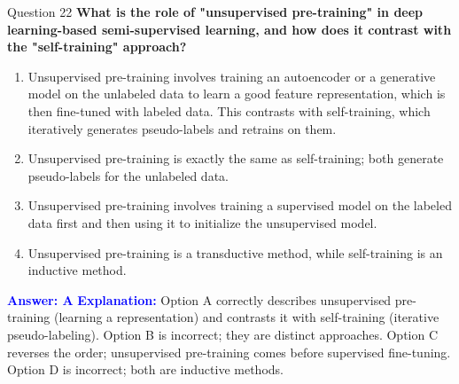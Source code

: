 \documentclass{beamer}
\begin{document}
	\begin{frame}{Question 22}
		\textbf{What is the role of "unsupervised pre-training" in deep learning-based semi-supervised learning, and how does it contrast with the "self-training" approach?}
		\begin{enumerate}
			\item Unsupervised pre-training involves training an autoencoder or a generative model on the unlabeled data to learn a good feature representation, which is then fine-tuned with labeled data. This contrasts with self-training, which iteratively generates pseudo-labels and retrains on them.
			\item Unsupervised pre-training is exactly the same as self-training; both generate pseudo-labels for the unlabeled data.
			\item Unsupervised pre-training involves training a supervised model on the labeled data first and then using it to initialize the unsupervised model.
			\item Unsupervised pre-training is a transductive method, while self-training is an inductive method.
		\end{enumerate}
		\vspace{0.2cm}
		\textcolor{blue}{\textbf{Answer: A}}
		\vspace{0.2cm}
		\textcolor{blue}{\textbf{Explanation:}} Option A correctly describes unsupervised pre-training (learning a representation) and contrasts it with self-training (iterative pseudo-labeling). Option B is incorrect; they are distinct approaches. Option C reverses the order; unsupervised pre-training comes before supervised fine-tuning. Option D is incorrect; both are inductive methods.
	\end{frame}
	
\end{document}
